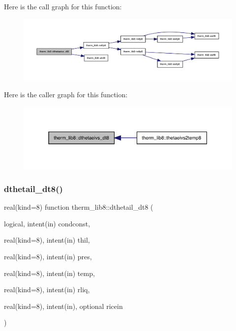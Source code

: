 Here is the call graph for this function\+:
\nopagebreak
\begin{figure}[H]
\begin{center}
\leavevmode
\includegraphics[width=350pt]{namespacetherm__lib8_a6f2144435a34b9e51e60dcab30877216_cgraph}
\end{center}
\end{figure}
Here is the caller graph for this function\+:
\nopagebreak
\begin{figure}[H]
\begin{center}
\leavevmode
\includegraphics[width=331pt]{namespacetherm__lib8_a6f2144435a34b9e51e60dcab30877216_icgraph}
\end{center}
\end{figure}
\mbox{\label{namespacetherm__lib8_acd882aa1f52e8cbaee8065ca35eb5867}} 
\subsubsection{\texorpdfstring{dthetail\+\_\+dt8()}{dthetail\_dt8()}}
{\footnotesize\ttfamily real(kind=8) function therm\+\_\+lib8\+::dthetail\+\_\+dt8 (\begin{DoxyParamCaption}\item[{logical, intent(in)}]{condconst,  }\item[{real(kind=8), intent(in)}]{thil,  }\item[{real(kind=8), intent(in)}]{pres,  }\item[{real(kind=8), intent(in)}]{temp,  }\item[{real(kind=8), intent(in)}]{rliq,  }\item[{real(kind=8), intent(in), optional}]{ricein }\end{DoxyParamCaption})}

